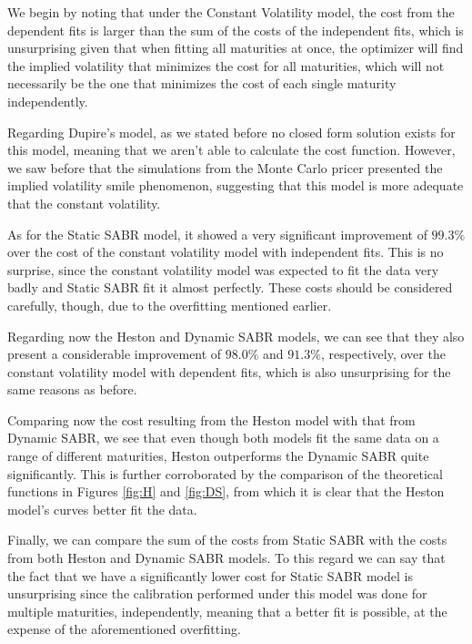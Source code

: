 We begin by noting that under the Constant Volatility model, the cost from the dependent fits is larger than the sum of the costs of the independent fits, which is unsurprising given that when fitting all maturities at once, the optimizer will find the implied volatility that minimizes the cost for all maturities, which will not necessarily be the one that minimizes the cost of each single maturity independently.

Regarding Dupire's model, as we stated before no closed form solution exists for this model, meaning that we aren't able to calculate the cost function. However, we saw before that the simulations from the Monte Carlo pricer presented the implied volatility smile phenomenon, suggesting that this model is more adequate that the constant volatility.

As for the Static SABR model, it showed a very significant improvement of $99.3\%$ over the cost of the constant volatility model with independent fits. This is no surprise, since the constant volatility model was expected to fit the data very badly and Static SABR fit it almost perfectly. These costs should be considered carefully, though, due to the overfitting mentioned earlier.


Regarding now the Heston and Dynamic SABR models, we can see that they also present a considerable improvement of $98.0\%$ and $91.3\%$, respectively, over the constant volatility model with dependent fits, which is also unsurprising for the same reasons as before.

Comparing now the cost resulting from the Heston model with that from Dynamic SABR, we see that even though both models fit the same data on a range of different maturities, Heston outperforms the Dynamic SABR quite significantly. This is further corroborated by the comparison of the theoretical functions in Figures \ref{fig:H} and \ref{fig:DS}, from which it is clear that the Heston model's curves better fit the data.



Finally, we can compare the sum of the costs from Static SABR with the costs from both Heston and Dynamic SABR models. To this regard we can say that the fact that we have a significantly lower cost for Static SABR model is unsurprising since the calibration performed under this model was done for multiple maturities, independently, meaning that a better fit is possible, at the expense of the aforementioned overfitting.

\vfill
\newpage

